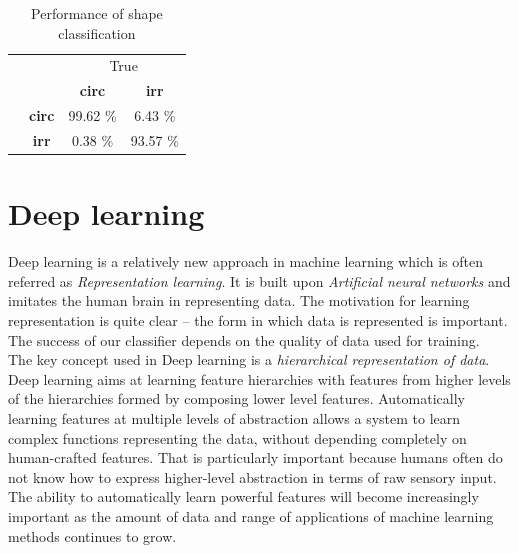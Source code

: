 \begin{table}
	\centering
	\caption{Performance of shape classification}
	\label{tab:ShpInt}
	\begin{tabular}{c c| c c}
				 & & \multicolumn{2}{c}{True} \\
			     & & \textbf{circ} & \textbf{irr} \\
			    \hline
			    \multirow{2}{*}{\rotatebox[origin=c]{90}{Pred}} & \textbf{circ} & \cellcolor{gray}99.62 \% & 6.43 \% \\
			    & \textbf{irr} & 0.38 \% & \cellcolor{gray}93.57 \%
			\end{tabular} 
\end{table}




\section{Deep learning}

Deep learning is a relatively new approach in machine learning which is often referred  as \textit{Representation learning}. It is built upon \textit{Artificial neural networks} and imitates the human brain in representing  data. The motivation for learning representation is quite clear -- the form in which data is represented is important. The success of our classifier depends on the quality of data used for training. \\

The key concept used in Deep learning is a \textit{hierarchical representation of data}. Deep learning aims at learning feature hierarchies with features from higher levels of the hierarchies formed by composing lower level features. Automatically learning features at multiple levels of abstraction allows a system to learn complex functions representing the data, without depending completely on human-crafted features. That is particularly important because humans often do not know how to express higher-level abstraction in terms of raw sensory input. The ability to automatically learn powerful features will become increasingly important as the amount of data and range of applications of machine learning methods continues to grow. \\

